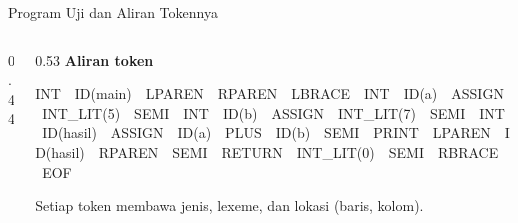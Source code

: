 \documentclass[aspectratio=169,10pt,t]{beamer}
\begin{document}
\begin{frame}[fragile]{Program Uji dan Aliran Tokennya}
  \begin{columns}[T,onlytextwidth]
    \begin{column}{0.44\textwidth}
      
    \end{column}
    \begin{column}{0.53\textwidth}
      \footnotesize
      \textbf{Aliran token}
      \par\vspace{2pt}
      {\ttfamily\scriptsize
      INT\ \textperiodcentered\ ID(main)\ \textperiodcentered\ LPAREN\
      \textperiodcentered\ RPAREN\ \textperiodcentered\ LBRACE\
      \textperiodcentered\ INT\ \textperiodcentered\ ID(a)\
      \textperiodcentered\ ASSIGN\ \textperiodcentered\ INT\_LIT(5)\
      \textperiodcentered\ SEMI\ \textperiodcentered\ INT\
      \textperiodcentered\ ID(b)\ \textperiodcentered\ ASSIGN\
      \textperiodcentered\ INT\_LIT(7)\ \textperiodcentered\ SEMI\
      \textperiodcentered\ INT\ \textperiodcentered\ ID(hasil)\
      \textperiodcentered\ ASSIGN\ \textperiodcentered\ ID(a)\
      \textperiodcentered\ PLUS\ \textperiodcentered\ ID(b)\
      \textperiodcentered\ SEMI\ \textperiodcentered\ PRINT\
      \textperiodcentered\ LPAREN\ \textperiodcentered\ ID(hasil)\
      \textperiodcentered\ RPAREN\ \textperiodcentered\ SEMI\
      \textperiodcentered\ RETURN\ \textperiodcentered\ INT\_LIT(0)\
      \textperiodcentered\ SEMI\ \textperiodcentered\ RBRACE\
      \textperiodcentered\ EOF}
      \par\vspace{4pt}
      {\scriptsize\color{ubbblue!75}Setiap token membawa jenis, lexeme,
      dan lokasi (baris, kolom).}
    \end{column}
  \end{columns}
\end{frame}
\end{document}

